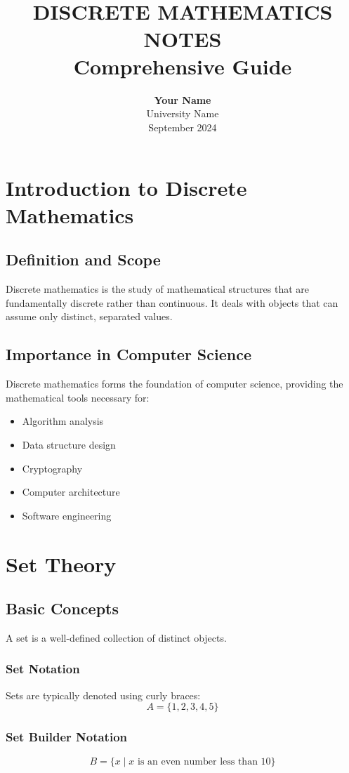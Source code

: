 \documentclass{article}
\title{
    \normalsize \textsc{}
    \\ [2.0cm]
    \HRule{1.5pt} \\
    \LARGE \textbf{\uppercase{Discrete Mathematics Notes}}
    \HRule{2.0pt} \\
    [0.6cm]
    \LARGE{Comprehensive Guide}
    \vspace*{10\baselineskip}
}
\date{}
\author{\textbf{Your Name} \\ University Name \\ September 2024}
\begin{document}
\maketitle
\newpage
\tableofcontents
\newpage

\section{Introduction to Discrete Mathematics}

\subsection{Definition and Scope}
Discrete mathematics is the study of mathematical structures that are fundamentally discrete rather than continuous. It deals with objects that can assume only distinct, separated values.

\subsection{Importance in Computer Science}
Discrete mathematics forms the foundation of computer science, providing the mathematical tools necessary for:
\begin{itemize}
    \item Algorithm analysis
    \item Data structure design
    \item Cryptography
    \item Computer architecture
    \item Software engineering
\end{itemize}

\section{Set Theory}

\subsection{Basic Concepts}
A set is a well-defined collection of distinct objects.

\subsubsection{Set Notation}
Sets are typically denoted using curly braces:
$$A = \{1, 2, 3, 4, 5\}$$

\subsubsection{Set Builder Notation}
$$B = \{x \mid x \text{ is an even number less than 10}\}$$
\end{document}
